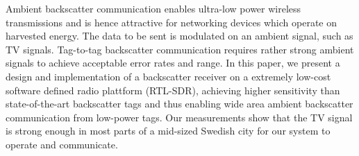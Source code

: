 Ambient backscatter communication enables ultra-low
power wireless transmissions and is hence attractive
for networking devices which operate on harvested energy. 
The data to be sent is modulated on an ambient signal, 
such as TV signals. Tag-to-tag backscatter communication 
requires rather strong ambient signals to achieve acceptable
error rates and range.
In this paper, we present a design and implementation of a
backscatter receiver on a extremely low-cost software defined radio plattform 
(RTL-SDR), achieving higher sensitivity than state-of-the-art
backscatter tags and thus enabling wide area ambient backscatter 
communication from low-power tags. 
Our measurements show that the TV signal is strong 
enough in most parts of a mid-sized Swedish city for our
system to operate and communicate. 
